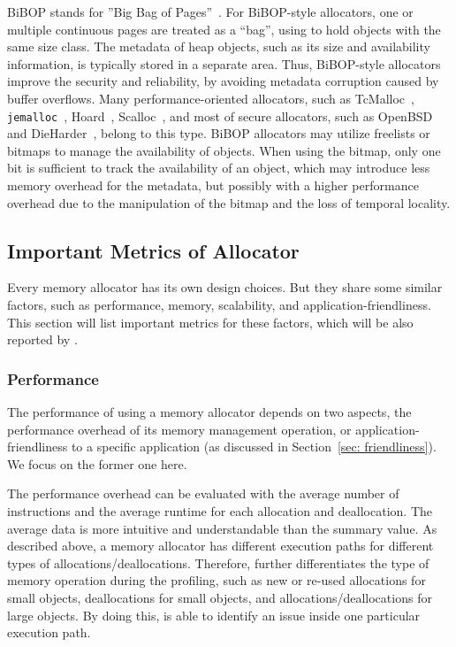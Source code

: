 BiBOP stands for ''Big Bag of Pages''~\citep{hanson1980}. For BiBOP-style allocators, one or multiple continuous pages are treated as a ``bag'', using to hold objects with the same size class. The metadata of heap objects, such as its size and availability information, is typically stored in a separate area. Thus, BiBOP-style allocators improve the security and reliability, by avoiding metadata corruption caused by buffer overflows. Many performance-oriented allocators, such as TcMalloc~\citep{tcmalloc}, \texttt{jemalloc}~\citep{jemalloc}, Hoard~\citep{Hoard}, Scalloc~\citep{Scalloc}, and most of secure allocators, such as OpenBSD~\citep{OpenBSD} and DieHarder~\citep{DieHarder}, belong to this type. BiBOP allocators may utilize freelists or bitmaps to manage the availability of objects. When using the bitmap, only one bit is sufficient to track the availability of an object, which may introduce less memory overhead for the metadata, but possibly with a higher performance overhead due to the manipulation of the bitmap and the loss of temporal locality.  


\subsection{Important Metrics of Allocator}

\label{sec:factors}

Every memory allocator has its own design choices. But they share some similar factors, such as performance, memory, scalability, and application-friendliness. This section will list important metrics for these factors, which will be also reported by \MP{}. 

\subsubsection{Performance}
\label{sec:performance}

The performance of using a memory allocator depends on two aspects, the performance overhead of its memory management operation, or application-friendliness to a specific application (as discussed in Section~\ref{sec: friendliness}). We focus on the former one here. 

The performance overhead can be evaluated with the average number of instructions and the average runtime for each allocation and deallocation. The average data is more intuitive and understandable than the summary value. As described above, a memory allocator has different execution paths for different types of allocations/deallocations. Therefore, \MP{} further differentiates the type of memory operation during the profiling, such as new or re-used allocations for small objects, deallocations for small objects, and allocations/deallocations for large objects. By doing this, \MP{} is able to identify an issue inside one particular execution path. 


